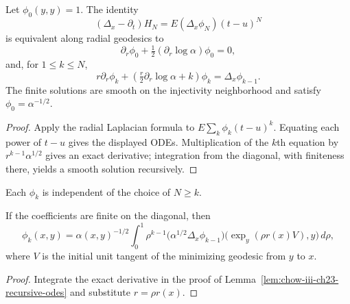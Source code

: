 \begin{lemma}
\label{lem:chow-iii-ch23-recursive-odes}
Let $\phi_0(y,y)=1$.  The identity
\[
(\Delta_x-\partial_t)H_N=E(\Delta_x\phi_N)(t-u)^N
\]
is equivalent along radial geodesics to
\[
\partial_r\phi_0+\tfrac12(\partial_r\log\alpha)\phi_0=0,
\]
and, for $1\le k\le N$,
\[
r\partial_r\phi_k+\left(\tfrac r2\partial_r\log\alpha+k\right)\phi_k
=\Delta_x\phi_{k-1}.
\]
The finite solutions are smooth on the injectivity neighborhood and satisfy
\(\phi_0=\alpha^{-1/2}\).
\end{lemma}
\begin{proof}
Apply the radial Laplacian formula to $E\sum_k\phi_k(t-u)^k$.  Equating each
power of $t-u$ gives the displayed ODEs.  Multiplication of the $k$th equation
by $r^{k-1}\alpha^{1/2}$ gives an exact derivative; integration from the
diagonal, with finiteness there, yields a smooth solution recursively.
\end{proof}

\begin{remark}[Independence of $N$]
\label{rem:chow-iii-ch23-coefficients-independent}
Each $\phi_k$ is independent of the choice of $N\ge k$.
\end{remark}

\begin{lemma}
\label{lem:chow-iii-ch23-recursive-formula}
If the coefficients are finite on the diagonal, then
\[
\phi_k(x,y)=\alpha(x,y)^{-1/2}\int_0^1\rho^{k-1}
 \bigl(\alpha^{1/2}\Delta_x\phi_{k-1}\bigr)
 \bigl(\exp_y(\rho r(x)V),y\bigr)\,d\rho,
\]
where $V$ is the initial unit tangent of the minimizing geodesic from $y$ to
$x$.
\end{lemma}
\begin{proof}
Integrate the exact derivative in the proof of Lemma~\ref{lem:chow-iii-ch23-recursive-odes}
and substitute $r=\rho r(x)$.
\end{proof}

